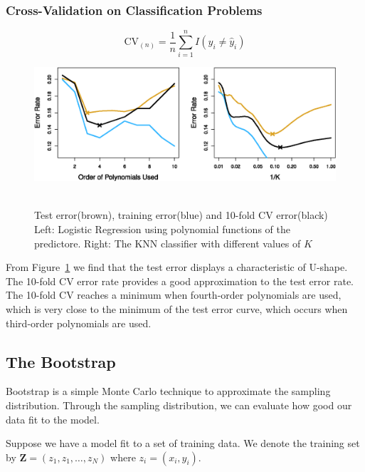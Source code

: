 \documentclass[12pt,a4paper]{article}%
\theoremstyle{definition}
\theoremstyle{plain}
\numberwithin{equation}{section}
\begin{document}
\subsubsection{\textbf{Cross-Validation on Classification Problems}}

\begin{equation*}
\text{CV}_{(n)} = \frac{1}{n}\sum\limits_{i=1}^{n} I(y_{i} \neq \hat{y}_{i})
\end{equation*}

\begin{figure}[H]
\centering
\includegraphics[scale=1]{images//5_8.eps}
\\~\\
\caption{Test error(brown), training error(blue) and 10-fold CV error(black) Left: Logistic Regression using polynomial functions of the predictore. Right: The KNN classifier with different values of $K$}\label{figure-5.8}
\end{figure}

From Figure~\ref{figure-5.8} we find that the test error displays a characteristic of U-shape. The 10-fold CV error rate provides a good approximation to the test error rate. 
The 10-fold CV reaches a minimum when fourth-order polynomials are used, which is very close to the minimum of the test error curve, which occurs when third-order polynomials are used. 


\subsection{\textbf{The Bootstrap}}
Bootstrap is a simple Monte Carlo technique to approximate the sampling distribution. 
Through the sampling distribution, we can evaluate how good our data fit to the model.

Suppose we have a model fit to a set of training data. We denote the training set by $\boldsymbol{Z} = (z_{1},z_{1},\dots,z_{N})$ where $z_{i}=(x_{i},y_{i})$.  
\end{document}
